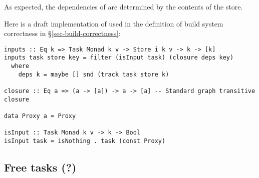 \noindent
As expected, the dependencies of  are determined by the contents of
the store.


Here is a draft implementation of  used in the definition of
build system correctness in \S\ref{sec-build-correctness}:

\begin{verbatim}
inputs :: Eq k => Task Monad k v -> Store i k v -> k -> [k]
inputs task store key = filter (isInput task) (closure deps key)
  where
    deps k = maybe [] snd (track task store k)

closure :: Eq a => (a -> [a]) -> a -> [a] -- Standard graph transitive closure

data Proxy a = Proxy

isInput :: Task Monad k v -> k -> Bool
isInput task = isNothing . task (const Proxy)
\end{verbatim}

\subsection{Free tasks (?)}









